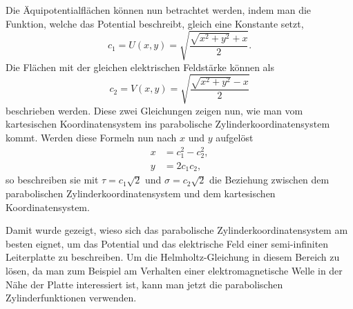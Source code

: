 
Die Äquipotentialflächen können nun betrachtet werden, 
indem man die Funktion, welche das Potential beschreibt, gleich eine Konstante setzt,
\begin{equation}
	c_1 = U(x,y) = \sqrt{\frac{\sqrt{x^2+y^2} + x}{2}}.
\end{equation}
Die Flächen mit der gleichen elektrischen Feldstärke können als
\begin{equation}
	c_2 = V(x,y) = \sqrt{\frac{\sqrt{x^2+y^2} - x}{2}}
\end{equation}
beschrieben werden. Diese zwei Gleichungen zeigen nun, wie man vom 
kartesischen Koordinatensystem ins parabolische Zylinderkoordinatensystem kommt.
Werden diese Formeln nun nach $x$ und $y$ aufgelöst 
\begin{align}
	x &=  c_1^2 - c_2^2 ,\\
	y &= 2c_1 c_2,
\end{align}
so beschreiben sie mit $\tau = c_1 \sqrt{2}$ und $\sigma = c_2 \sqrt{2}$ die Beziehung 
zwischen dem parabolischen Zylinderkoordinatensystem und dem kartesischen Koordinatensystem.

Damit wurde gezeigt, wieso sich das parabolische Zylinderkoordinatensystem am besten eignet, um 
das Potential und das elektrische Feld einer semi-infiniten Leiterplatte zu beschreiben.
Um die Helmholtz-Gleichung in diesem Bereich zu lösen, 
da man zum Beispiel am Verhalten einer elektromagnetische Welle in der Nähe 
der Platte interessiert ist, kann man jetzt die parabolischen Zylinderfunktionen verwenden. 
